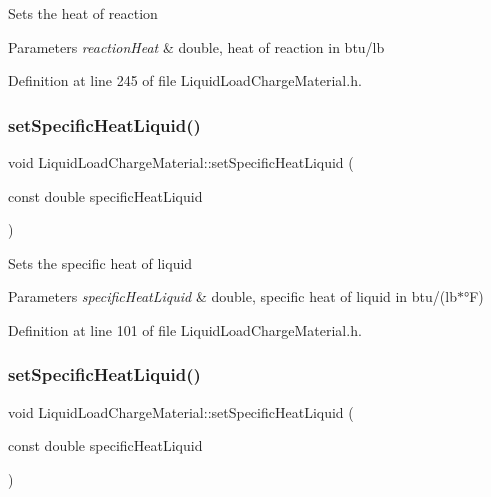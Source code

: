Sets the heat of reaction 
\begin{DoxyParams}{Parameters}
{\em reaction\+Heat} & double, heat of reaction in btu/lb \\
\hline
\end{DoxyParams}


Definition at line 245 of file Liquid\+Load\+Charge\+Material.\+h.

\mbox{\label{class_liquid_load_charge_material_a2187c4c6ba394c05ab42e769bf175683}} 
\subsubsection{\texorpdfstring{set\+Specific\+Heat\+Liquid()}{setSpecificHeatLiquid()}\hspace{0.1cm}{\footnotesize\ttfamily [1/3]}}
{\footnotesize\ttfamily void Liquid\+Load\+Charge\+Material\+::set\+Specific\+Heat\+Liquid (\begin{DoxyParamCaption}\item[{const double}]{specific\+Heat\+Liquid }\end{DoxyParamCaption})\hspace{0.3cm}{\ttfamily [inline]}}

Sets the specific heat of liquid 
\begin{DoxyParams}{Parameters}
{\em specific\+Heat\+Liquid} & double, specific heat of liquid in btu/(lb$\ast$°F) \\
\hline
\end{DoxyParams}


Definition at line 101 of file Liquid\+Load\+Charge\+Material.\+h.

\mbox{\label{class_liquid_load_charge_material_a2187c4c6ba394c05ab42e769bf175683}} 
\subsubsection{\texorpdfstring{set\+Specific\+Heat\+Liquid()}{setSpecificHeatLiquid()}\hspace{0.1cm}{\footnotesize\ttfamily [2/3]}}
{\footnotesize\ttfamily void Liquid\+Load\+Charge\+Material\+::set\+Specific\+Heat\+Liquid (\begin{DoxyParamCaption}\item[{const double}]{specific\+Heat\+Liquid }\end{DoxyParamCaption})\hspace{0.3cm}{\ttfamily [inline]}}

